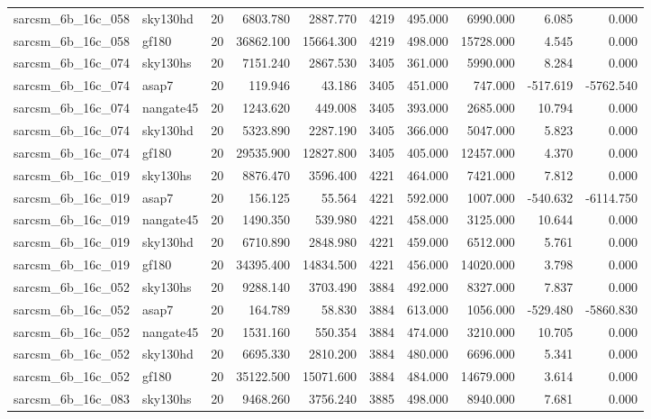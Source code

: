 \documentclass{article}
\begin{document}
\begin{longtable}{llrrrrrrrr}
sarcsm\_6b\_16c\_058 & sky130hd & 20 & 6803.780 & 2887.770 & 4219 & 495.000 & 6990.000 & 6.085 & 0.000 \\
sarcsm\_6b\_16c\_058 & gf180 & 20 & 36862.100 & 15664.300 & 4219 & 498.000 & 15728.000 & 4.545 & 0.000 \\
sarcsm\_6b\_16c\_074 & sky130hs & 20 & 7151.240 & 2867.530 & 3405 & 361.000 & 5990.000 & 8.284 & 0.000 \\
sarcsm\_6b\_16c\_074 & asap7 & 20 & 119.946 & 43.186 & 3405 & 451.000 & 747.000 & -517.619 & -5762.540 \\
sarcsm\_6b\_16c\_074 & nangate45 & 20 & 1243.620 & 449.008 & 3405 & 393.000 & 2685.000 & 10.794 & 0.000 \\
sarcsm\_6b\_16c\_074 & sky130hd & 20 & 5323.890 & 2287.190 & 3405 & 366.000 & 5047.000 & 5.823 & 0.000 \\
sarcsm\_6b\_16c\_074 & gf180 & 20 & 29535.900 & 12827.800 & 3405 & 405.000 & 12457.000 & 4.370 & 0.000 \\
sarcsm\_6b\_16c\_019 & sky130hs & 20 & 8876.470 & 3596.400 & 4221 & 464.000 & 7421.000 & 7.812 & 0.000 \\
sarcsm\_6b\_16c\_019 & asap7 & 20 & 156.125 & 55.564 & 4221 & 592.000 & 1007.000 & -540.632 & -6114.750 \\
sarcsm\_6b\_16c\_019 & nangate45 & 20 & 1490.350 & 539.980 & 4221 & 458.000 & 3125.000 & 10.644 & 0.000 \\
sarcsm\_6b\_16c\_019 & sky130hd & 20 & 6710.890 & 2848.980 & 4221 & 459.000 & 6512.000 & 5.761 & 0.000 \\
sarcsm\_6b\_16c\_019 & gf180 & 20 & 34395.400 & 14834.500 & 4221 & 456.000 & 14020.000 & 3.798 & 0.000 \\
sarcsm\_6b\_16c\_052 & sky130hs & 20 & 9288.140 & 3703.490 & 3884 & 492.000 & 8327.000 & 7.837 & 0.000 \\
sarcsm\_6b\_16c\_052 & asap7 & 20 & 164.789 & 58.830 & 3884 & 613.000 & 1056.000 & -529.480 & -5860.830 \\
sarcsm\_6b\_16c\_052 & nangate45 & 20 & 1531.160 & 550.354 & 3884 & 474.000 & 3210.000 & 10.705 & 0.000 \\
sarcsm\_6b\_16c\_052 & sky130hd & 20 & 6695.330 & 2810.200 & 3884 & 480.000 & 6696.000 & 5.341 & 0.000 \\
sarcsm\_6b\_16c\_052 & gf180 & 20 & 35122.500 & 15071.600 & 3884 & 484.000 & 14679.000 & 3.614 & 0.000 \\
sarcsm\_6b\_16c\_083 & sky130hs & 20 & 9468.260 & 3756.240 & 3885 & 498.000 & 8940.000 & 7.681 & 0.000 \\

\end{longtable}
\end{document}
